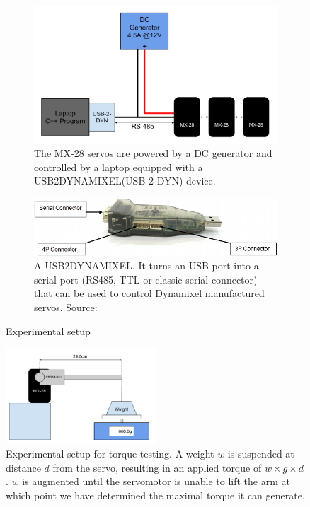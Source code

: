 \begin{figure}[htp]
\centering
    \begin{subfigure}[b]{0.45\textwidth}
    \includegraphics[width=\textwidth]{figures/exp_setup}
    \caption[Experimental setup]{The MX-28 servos are powered by a DC generator and controlled by a laptop equipped with a USB2DYNAMIXEL(USB-2-DYN) device.}
    \label{fig:dc_chain}
    \end{subfigure}
    \hfill
    \begin{subfigure}[b]{0.45\textwidth}
    \includegraphics[width = \textwidth]{figures/u2d}
    \caption[USB2DYNAMIXEL]{A USB2DYNAMIXEL. It turns an USB port into a serial port (RS485, TTL or classic serial connector) that can be used to control Dynamixel manufactured servos. Source: \cite{usb2dyn_manual}}
    \label{fig:usb2dyn}
    \end{subfigure}
    \caption{Experimental setup \label{fig:exp_setup}}
\end{figure}

\begin{figure}[htp]
\centering
    \includegraphics[width = 0.5\textwidth]{figures/exp1}
    \caption[Experimental setup for torque testing]{Experimental setup for torque testing. A weight $w$ is suspended at distance $d$ from the servo, resulting in an applied torque of $w \times g \times d$. $w$ is augmented until the servomotor is unable to lift the arm at which point we have determined the maximal torque it can generate.}
    \label{fig:exp1}
\end{figure}

